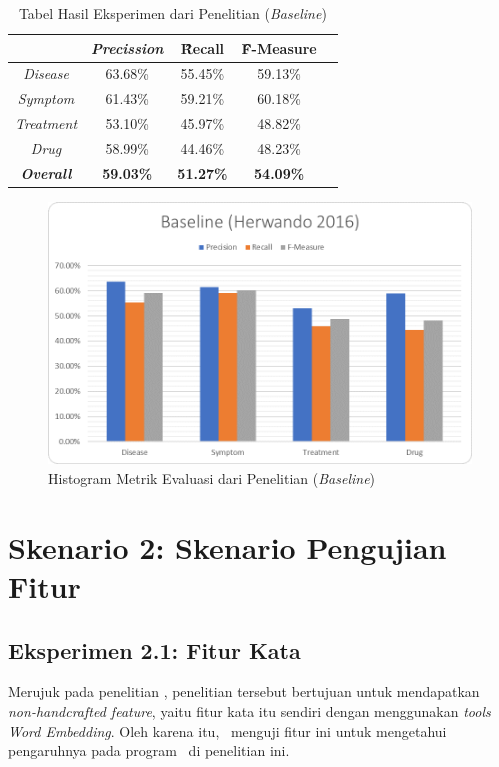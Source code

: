 \begin{table}
	\centering
	\caption{Tabel Hasil Eksperimen dari Penelitian \cite{skripsiKakRadit} (\textit{Baseline})}
	\begin{tabular}{|c|c|c|c|c|}
		\hline
							& \textit{Precission} & \f{\f{Recall}} & \f{\f{F-Measure}} \\ \hline
		\textit{Disease}    & 63.68\%             & 55.45\%        & 59.13\%           \\ \hline
		\textit{Symptom}    & 61.43\%             & 59.21\%        & 60.18\%           \\ \hline
		\textit{Treatment}  & 53.10\%             & 45.97\%        & 48.82\%           \\ \hline
		\textit{Drug}		& 58.99\%             & 44.46\%        & 48.23\%           \\ \hline
		\textit{\textbf{Overall}}&\textbf{59.03\%}  & \textbf{51.27\%}& \textbf{54.09\%} \\ \hline
	    \end{tabular}
\label{table:radit}
\end{table}

\begin{figure}
	\centering
	\includegraphics[width=0.85\linewidth]{images/radit}
	\caption{Histogram Metrik Evaluasi dari Penelitian \cite{skripsiKakRadit} (\textit{Baseline})}
	\label{fig:radit}
\end{figure}


\section{Skenario 2: Skenario Pengujian Fitur}
		  
	\subsection{Eksperimen 2.1: Fitur Kata}
	Merujuk pada penelitian \cite{mujiono2016new}, penelitian tersebut bertujuan untuk mendapatkan \textit{non-handcrafted feature}, yaitu fitur kata itu sendiri dengan menggunakan \textit{tools Word Embedding}. Oleh karena itu, \saya~menguji fitur ini untuk mengetahui pengaruhnya pada program \mer~di penelitian ini. 
	
